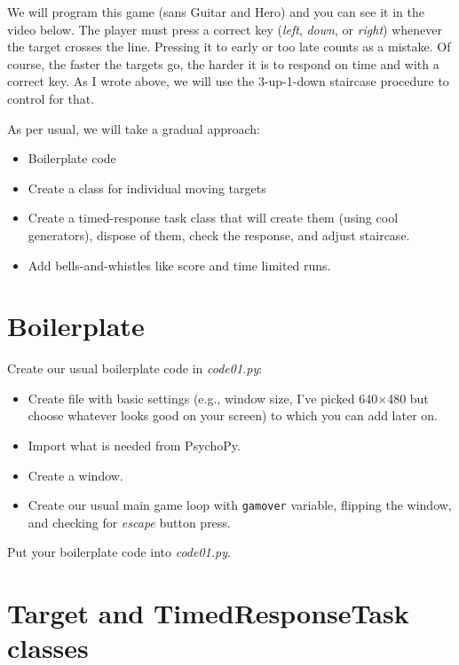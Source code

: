 \documentclass[
]{book}
\providecommand{\tightlist}{%
  \setlength{\itemsep}{0pt}\setlength{\parskip}{0pt}}
\begin{document}
We will program this game (sans Guitar and Hero) and you can see it in the video below. The player must press a correct key (\emph{left}, \emph{down}, or \emph{right}) whenever the target crosses the line. Pressing it to early or too late counts as a mistake. Of course, the faster the targets go, the harder it is to respond on time and with a correct key. As I wrote above, we will use the 3-up-1-down staircase procedure to control for that.

As per usual, we will take a gradual approach:

\begin{itemize}
\tightlist
\item
  Boilerplate code
\item
  Create a class for individual moving targets
\item
  Create a timed-response task class that will create them (using cool generators), dispose of them, check the response, and adjust staircase.
\item
  Add bells-and-whistles like score and time limited runs.
\end{itemize}

\hypertarget{boilerplate}{%
\section{Boilerplate}\label{boilerplate}}

Create our usual boilerplate code in \emph{code01.py}:

\begin{itemize}
\tightlist
\item
  Create file with basic settings (e.g., window size, I've picked 640×480 but choose whatever looks good on your screen) to which you can add later on.
\item
  Import what is needed from PsychoPy.
\item
  Create a window.
\item
  Create our usual main game loop with \texttt{gamover} variable, flipping the window, and checking for \emph{escape} button press.
\end{itemize}

Put your boilerplate code into \emph{code01.py}.

\hypertarget{target-and-timedresponsetask-classes}{%
\section{Target and TimedResponseTask classes}\label{target-and-timedresponsetask-classes}}
\end{document}
